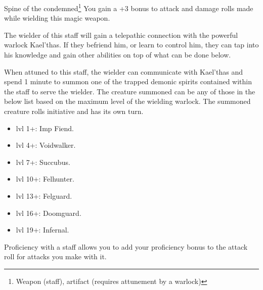 \begin{commentbox}{Spine of the condemned\footnote{Weapon (staff), artifact (requires attunement by a warlock)}}
	You gain a +3 bonus to attack and damage rolls made while wielding this magic weapon. 
	
	The wielder of this staff will gain a telepathic connection with the powerful warlock Kael'thas. If they befriend him, or learn to control him, they can tap into his knowledge and gain other abilities on top of what can be done below.
	
	When attuned to this staff, the wielder can communicate with Kael'thas and spend 1 minute to summon one of the trapped demonic spirits contained within the staff to serve the wielder. The creature summoned can be any of those in the below list based on the maximum level of the wielding warlock. The summoned creature rolls initiative and has its own turn.
	\begin{multicols}{4}
		\begin{itemize}
			\item lvl 1+: Imp Fiend.
			\item lvl 4+: Voidwalker. 
			\item lvl 7+: Succubus.
			\item lvl 10+: Felhunter. 
			\item lvl 13+: Felguard.
			\item lvl 16+: Doomguard.
			\item lvl 19+: Infernal.
		\end{itemize}
	\end{multicols}
	
	Proficiency with a staff allows you to add your proficiency bonus to the attack roll for attacks you make with it.
	

\end{commentbox}
